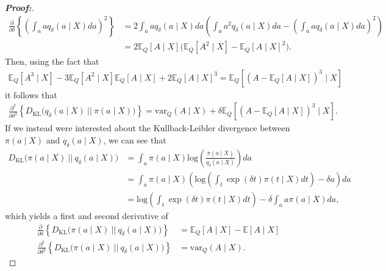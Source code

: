 \documentclass[11pt,twoside]{article}
\newcommand{\var}{\text{var}}
\theoremstyle{definition}
\theoremstyle{remark}
\begin{document}
\begin{proof}[\textbf{Proof:}]
\begin{align*}
        \frac{\partial}{\partial \delta} \left\{ \left( \int_a a q_\delta(a \mid X) da \right)^2  \right\} &= 2 \int_a a q_\delta(a \mid X) da \left(\int_a a^2 q_\delta(a \mid X) da - \left( \int_a a q_\delta(a \mid X) da \right)^2 \right) \\
        &= 2 \mathbb{E}_Q[A \mid X] \Big(\mathbb{E}_Q[A^2 \mid X] - \mathbb{E}_Q[A \mid X]^2 \Big).
    \end{align*}
    Then, using the fact that
    \begin{align*}
        \mathbb{E}_Q[A^3 \mid X] - 3\mathbb{E}_Q[A^2 \mid X] \mathbb{E}_Q[A 
        \mid X]  + 2 \mathbb{E}_Q[A \mid X]^3 = \mathbb{E}_Q\left[(A - \mathbb{E}_Q[A \mid X])^3 \mid X \right]
    \end{align*}
    it follows that
    \begin{align*}
        \frac{\partial^2}{\partial \delta^2}  \left\{ D_{\text{KL}}\Big(q_\delta(a \mid X) \: || \: \pi(a \mid X) \Big) \right\} = \var_Q(A \mid X) + \delta \mathbb{E}_Q\left[(A - \mathbb{E}_Q[A \mid X])^3 \mid X \right].
    \end{align*}
    If we instead were interested about the Kullback-Leibler divergence between $\pi(a \mid X)$ and $q_\delta(a \mid X)$, we can see that
    \begin{align*}
         D_{\text{KL}}\Big(\pi(a \mid X) \: || \: q_\delta(a \mid X) \Big) &= \int_a \pi(a \mid X) \text{log}\left(\frac{\pi(a \mid X)}{q_\delta(a \mid X)} \right) da \\
         &= \int_a \pi(a \mid X) \left(\text{log}\left(\int_t \exp(\delta t) \pi(t \mid X) dt \right) - \delta a \right) da \\
         &= \text{log}\left(\int_t \exp(\delta t) \pi(t \mid X) dt \right)   - \delta \int_a a \pi(a \mid X) da,
    \end{align*}
    which yields a first and second derivative of
    \begin{align*}
        \frac{\partial}{\partial \delta} \left\{ D_{\text{KL}}\Big(\pi(a \mid X) \: || \: q_\delta(a \mid X) \Big) \right\} &= \mathbb{E}_Q[A \mid X] - \mathbb{E}[A \mid X] \\
        \frac{\partial^2}{\partial \delta^2} \left\{ D_{\text{KL}}\Big(\pi(a \mid X) \: || \: q_\delta(a \mid X) \Big) \right\} &= \var_Q(A \mid X).
    \end{align*}
\end{proof}
\end{document}
